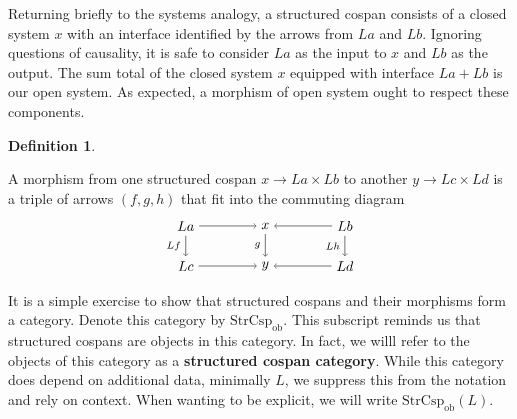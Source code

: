 \documentclass{amsart}
\newcommand{\ob}{_{ \text{ob} }}
\newcommand{\StrCsp}{\cat{StrCsp}}
\newcommand{\defn}[1]{\textbf{#1}}
\newcommand{\cat}[1]{\mathrm{#1}}
\newcommand{\csp}[3]{#2 \to #1 \times #3}
\theoremstyle{remark}
\theoremstyle{definition}
\newtheorem{definition}[theorem]{Definition}
\begin{document}
Returning briefly to the systems analogy, a structured cospan consists
of a closed system $ x $ with an interface identified by the arrows
from $ La $ and $ Lb $. Ignoring questions of causality, it is safe to
consider $ La $ as the input to $ x $ and $ Lb $ as the output. The
sum total of the closed system $ x $ equipped with interface
$ La + Lb $ is our open system. As expected, a morphism of open system
ought to respect these components.

\begin{definition} \label{df:morph-of-strcsp}

  A morphism from one structured cospan
  \(
  \csp{La}{x}{Lb}
  \)
  to another
  \(
    \csp{Lc}{y}{Ld}
  \)
  is a triple of arrows $ ( f,g,h ) $ that fit into the commuting
  diagram
  \[
    \begin{tikzpicture}
      \node (1) at (-2,1) {\( La \)};
      \node (2) at (0,1) {\( x \)};
      \node (3) at (2,1) {\( Lb \)};
      \node (4) at (-2,0) {\( Lc \)};
      \node (5) at (0,0) {\( y \)};
      \node (6) at (2,0) {\( Ld \)};
      \draw [->] (1) to node [above] {\scriptsize{\(  \)}} (2);
      \draw [->] (3) to node [above] {\scriptsize{\(  \)}} (2);
      \draw [->] (4) to node [below] {\scriptsize{\(  \)}} (5);
      \draw [->] (6) to node [below] {\scriptsize{\(  \)}} (5);
      \draw [->] (1) to node [left] {\scriptsize{\( Lf \)}} (4);
      \draw [->] (2) to node [left] {\scriptsize{\( g \)}} (5);
      \draw [->] (3) to node [left] {\scriptsize{\( Lh \)}} (6);
    \end{tikzpicture}
  \]
\end{definition}

It is a simple exercise to show that structured cospans and their
morphisms form a category.  Denote this category by $ \StrCsp\ob
$. This subscript reminds us that structured cospans are objects in
this category. In fact, we willl refer to the objects of this category
as a \defn{structured cospan category}. While this category does
depend on additional data, minimally $ L $, we suppress this from the
notation and rely on context. When wanting to be explicit, we will
write $ \StrCsp\ob ( L ) $.

\end{document}
